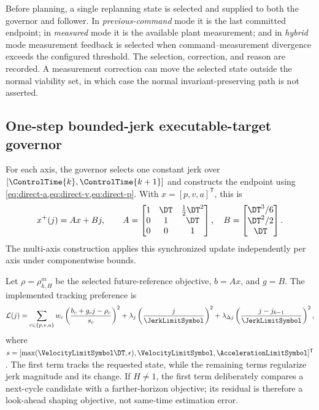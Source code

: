 Before planning, a single replanning state is selected and supplied to both
the governor and follower.  In \emph{previous-command} mode it is the last
committed endpoint; in \emph{measured} mode it is the available plant
measurement; and in \emph{hybrid} mode measurement feedback is selected when
command--measurement divergence exceeds the configured threshold.  The
selection, correction, and reason are recorded.  A measurement correction can
move the selected state outside the normal viability set, in which case the
normal invariant-preserving path is not asserted.

\subsection{One-step bounded-jerk executable-target governor}

For each axis, the governor selects one constant jerk over
\([\ControlTime{k},\ControlTime{k+1}]\) and constructs the endpoint using
\cref{eq:direct-a,eq:direct-v,eq:direct-p}.  With
\(x=[p,v,a]^{\mathsf T}\), this is
\begin{equation}
  x^+(j)=Ax+Bj,\qquad
  A=
  \begin{bmatrix}
    1&\DT&\tfrac12\DT^2\\
    0&1&\DT\\
    0&0&1
  \end{bmatrix},
  \quad
  B=
  \begin{bmatrix}
    \DT^3/6\\ \DT^2/2\\ \DT
  \end{bmatrix}.
  \label{eq:state-affine-in-jerk}
\end{equation}
The multi-axis construction applies this synchronized update independently
per axis under componentwise bounds.

Let \(\rho=\rho_{k,H}^{m}\) be the selected future-reference objective,
\(b=Ax\), and \(g=B\).  The implemented tracking preference is
\begin{equation}
  \mathcal L(j)=
  \sum_{c\in\{p,v,a\}}
    w_c\left(\frac{b_c+g_cj-\rho_c}{s_c}\right)^2
  +\lambda_j\left(\frac{j}{\JerkLimitSymbol}\right)^2
  +\lambda_{\Delta j}
    \left(\frac{j-j_{k-1}}{\JerkLimitSymbol}\right)^2,
  \label{eq:governor-objective}
\end{equation}
where
\(s=[\max(\VelocityLimitSymbol\DT,\epsilon),
\VelocityLimitSymbol,\AccelerationLimitSymbol]^{\mathsf T}\).
The first term tracks the requested state, while the remaining terms regularize
jerk magnitude and its change.  If \(H\neq1\), the first term deliberately
compares a next-cycle candidate with a farther-horizon objective; its residual
is therefore a look-ahead shaping objective, not same-time estimation error.

